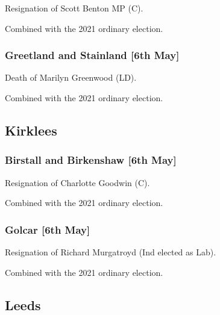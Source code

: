 \documentclass[a4paper,openany]{book}
\begin{document}
\begin{resultsiii}

Resignation of Scott Benton MP (C).

Combined with the 2021 ordinary election.

\subsubsection*{Greetland and Stainland \hspace*{\fill}\nolinebreak[1]%
	\enspace\hspace*{\fill}
	[6th May]}


Death of Marilyn Greenwood (LD).

Combined with the 2021 ordinary election.

\subsection*{Kirklees}

\subsubsection*{Birstall and Birkenshaw \hspace*{\fill}\nolinebreak[1]%
	\enspace\hspace*{\fill}
	[6th May]}


Resignation of Charlotte Goodwin (C).

Combined with the 2021 ordinary election.

\subsubsection*{Golcar \hspace*{\fill}\nolinebreak[1]%
	\enspace\hspace*{\fill}
	[6th May]}


Resignation of Richard Murgatroyd (Ind elected as Lab).

Combined with the 2021 ordinary election.

\subsection*{Leeds}


\end{resultsiii}
\end{document}
